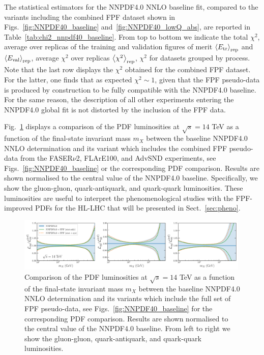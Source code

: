 The statistical estimators for the NNPDF4.0 NNLO
baseline fit, compared to the variants including
the combined FPF dataset shown in Figs.~\ref{fig:NNPDF40_baseline}
and~\ref{fig:NNPDF40_lowQ_abs}, are reported in Table~\ref{tab:chi2_nnpdf40_baseline}.
%
From top to bottom we indicate the total $\chi^2$, average
over replicas of the training and validation figures of merit
$\left\langle E_{\rm tr}\right\rangle_{\rm rep}$ and $\left\langle E_{\rm val}\right\rangle_{\rm rep}$,
average $\chi^2$ over replicas $\left\langle \chi^2\right\rangle_{\rm rep}$,
$\chi^2$ for datasets grouped by process.
%
Note that the last row displays the $\chi^2$ obtained for the combined FPF dataset.
%
For the latter, one finds that as expected $\chi^2 \sim 1$, given that the FPF pseudo-data
is produced by construction to be fully compatible with the NNPDF4.0 baseline.
%
For the same reason, the description of all other experiments entering
the NNPDF4.0 global fit is not distorted by the inclusion of the FPF data.

Fig.~\ref{fig:nnpdf40_fpf_lumis} displays a comparison of the PDF luminosities at $\sqrt{s}=14$ TeV
as a function of the final-state invariant mass $m_X$ between
the baseline NNPDF4.0 NNLO determination and its variant which includes
the combined FPF pseudo-data from the FASER$\nu$2, FLArE100, and AdvSND experiments,
see Figs.~\ref{fig:NNPDF40_baseline} or the corresponding PDF comparison.
%
%
  Results are shown normalised to the central value of the NNPDF4.0 baseline.
  Specifically, we show the gluon-gluon, quark-antiquark, and
  quark-quark luminosities.
These luminosities are useful to interpret the phenomenological studies with the FPF-improved
PDFs for the HL-LHC that will be presented in Sect.~\ref{sec:pheno}.

\begin{figure}[t]
\centering
\includegraphics[width=0.99\textwidth]{plots/lumi-FPFall.pdf}
\caption{Comparison of the PDF luminosities at $\sqrt{s}=14$ TeV
  as a function of the final-state invariant mass $m_X$ between
  the baseline NNPDF4.0 NNLO determination and its variants which include
  the full set of FPF pseudo-data, see Figs.~\ref{fig:NNPDF40_baseline}
  for the corresponding PDF comparison.
  Results are shown normalised to the central value of the NNPDF4.0 baseline.
  From left to right we show the gluon-gluon, quark-antiquark, and
  quark-quark luminosities.
%
}
\label{fig:nnpdf40_fpf_lumis}
\end{figure}

